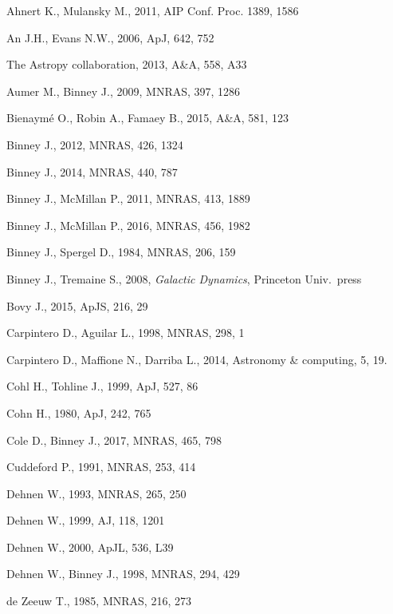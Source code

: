 \documentclass[12pt]{article}
\begin{document}
\begin{thebibliography}{99} \setlength{\parskip}{2pt} \setlength{\itemsep}{2pt}

Ahnert K., Mulansky M., 2011, AIP Conf. Proc. 1389, 1586

An J.H., Evans N.W., 2006, ApJ, 642, 752

The Astropy collaboration, 2013, A\&A, 558, A33

Aumer M., Binney J., 2009, MNRAS, 397, 1286

Bienaym\'e O., Robin A., Famaey B., 2015, A\&A, 581, 123

Binney J., 2012, MNRAS, 426, 1324

Binney J., 2014, MNRAS, 440, 787

Binney J., McMillan P., 2011, MNRAS, 413, 1889

Binney J., McMillan P., 2016, MNRAS, 456, 1982

Binney J., Spergel D., 1984, MNRAS, 206, 159

Binney J., Tremaine S., 2008, \textsl{Galactic Dynamics}, Princeton Univ.\ press

Bovy J., 2015, ApJS, 216, 29

Carpintero D., Aguilar L., 1998, MNRAS, 298, 1

Carpintero D., Maffione N., Darriba L., 2014, Astronomy \& computing, 5, 19.

Cohl H., Tohline J., 1999, ApJ, 527, 86

Cohn H., 1980, ApJ, 242, 765

Cole D., Binney J., 2017, MNRAS, 465, 798

Cuddeford P., 1991, MNRAS, 253, 414

Dehnen W., 1993, MNRAS, 265, 250

Dehnen W., 1999, AJ, 118, 1201

Dehnen W., 2000, ApJL, 536, L39

Dehnen W., Binney J., 1998, MNRAS, 294, 429

de Zeeuw T., 1985, MNRAS, 216, 273


\end{thebibliography}
\end{document}
